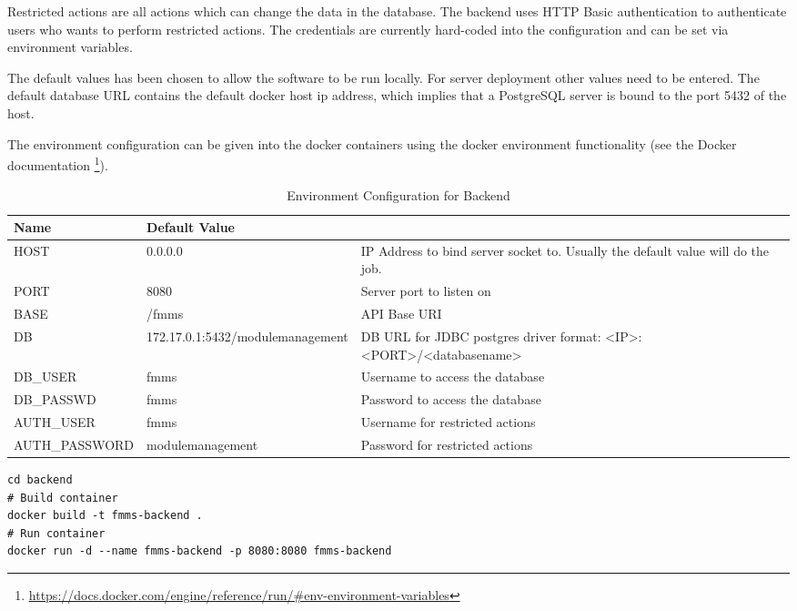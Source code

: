 Restricted actions are all actions which can change the data in the database. The backend uses HTTP Basic authentication to authenticate users who wants to perform restricted actions. The credentials are currently hard-coded into the configuration and can be set via environment variables.

The default values has been chosen to allow the software to be run locally. For server deployment other values need to be entered.
The default database URL contains the default docker host ip address, which implies that a PostgreSQL server is bound to the port 5432 of the host.

The environment configuration can be given into the docker containers using the docker environment functionality (see the Docker documentation \footnote{\url{https://docs.docker.com/engine/reference/run/\#env-environment-variables}}). 

\begin{minipage}{\textwidth}
\begin{table}[H]
	\renewcommand{\arraystretch}{1.2}
	\centering
	\begin{tabularx}{\textwidth}{|l|l|X|}
		\hline
		\textbf{Name} & \textbf{Default Value} &  \\ \hline
		HOST & 0.0.0.0 & IP Address to bind server socket to. Usually the default value will do the job. \\ \hline
		PORT & 8080 & Server port to listen on \\ \hline
		BASE & /fmms & API Base URI \\ \hline
		DB & 172.17.0.1:5432/modulemanagement & DB URL for JDBC postgres driver format: <IP>:<PORT>/<databasename> \\ \hline
		DB\_USER & fmms & Username to access the database \\ \hline
		DB\_PASSWD & fmms & Password to access the database \\ \hline
		AUTH\_USER & fmms & Username for restricted actions \\ \hline
		AUTH\_PASSWORD & modulemanagement & Password for restricted actions \\ \hline
	\end{tabularx}
	\caption{Environment Configuration for Backend}
	\label{backend-env}
\end{table}
\end{minipage}

\begin{minipage}{\textwidth}
\begin{lstlisting}[caption={Build Backend Container}]
cd backend
# Build container
docker build -t fmms-backend .
# Run container
docker run -d --name fmms-backend -p 8080:8080 fmms-backend
\end{lstlisting}
\end{minipage}

